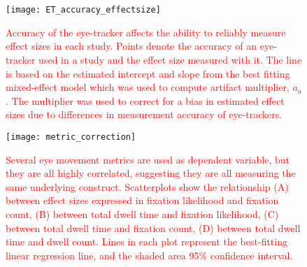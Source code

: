 
\FloatBarrier
\section{}
\label{appendix}


\begin{figure}
\texttt{[image: ET\_accuracy\_effectsize]}
\centering
\caption{\textcolor{Red}{Accuracy of the eye-tracker affects the ability to reliably measure effect sizes in each study. Points denote the accuracy of an eye-tracker used in a study and the effect size measured with it. The line is based on the estimated intercept and slope from the best fitting mixed-effect model which was used to compute artifact multiplier, $a_a$. The multiplier was used to correct for a bias in estimated effect sizes due to differences in measurement accuracy of eye-trackers.}}
\label{fig:ET_accuracy_effectsize}
\end{figure}
\clearpage



\clearpage


\begin{figure}%
\texttt{[image: metric\_correction]}
\centering
\caption{\textcolor{Red}{Several eye movement metrics are used as dependent variable, but they are all highly correlated, suggesting they are all measuring the same underlying construct. Scatterplots show the relationship (A) between effect sizes expressed in fixation likelihood and fixation count, (B) between total dwell time and fixation likelihood, (C) between total dwell time and fixation count, (D) between total dwell time and dwell count. Lines in each plot represent the best-fitting linear regression line, and the shaded area 95\% confidence interval.}}
\label{fig:metric_correction}
\end{figure}
\clearpage



\clearpage



\clearpage


\clearpage

